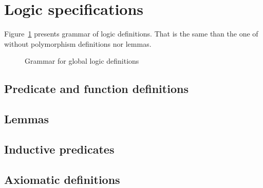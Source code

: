 
\section{Logic specifications}
\label{sec:logicspec}


Figure~\ref{fig:gram:logic} presents grammar of logic definitions. That is the
same than the one of \acsl without polymorphism definitions nor lemmas.

\begin{figure}[htbp]
  \caption{Grammar for global logic definitions}
\label{fig:gram:logic}
\end{figure}


\subsection{Predicate and function definitions}
\nodiff


\subsection{Lemmas}
\absent


\subsection{Inductive predicates}
\absent


\subsection{Axiomatic definitions}
\absent

